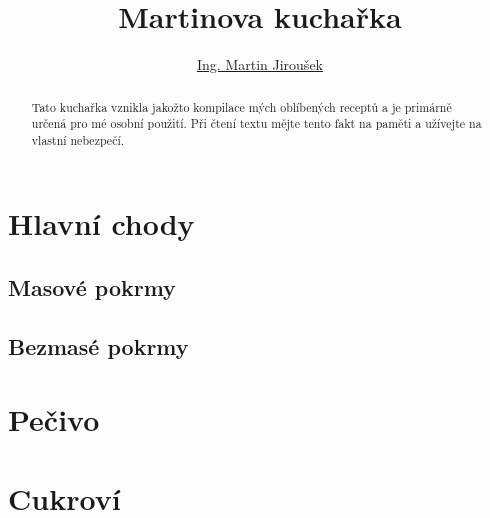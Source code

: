 \documentclass[%
a4paper,
11pt
]{article}
\begin{document}
\title{Martinova kuchařka}
\author{\href{martin.luther.jirousek@gmail.com}{Ing. Martin Jiroušek}}
\maketitle

\begin{abstract}
	Tato kuchařka vznikla jakožto kompilace mých oblíbených receptů a je primárně určená pro mé osobní použití. Při čtení textu mějte tento fakt na paměti a užívejte na vlastní nebezpečí.
\end{abstract}

\tableofcontents

\vspace{5em}


%

\section{Hlavní chody}
\subsection{Masové pokrmy}



\subsection{Bezmasé pokrmy}


\section{Pečivo}


\section{Cukroví}

\end{document}
